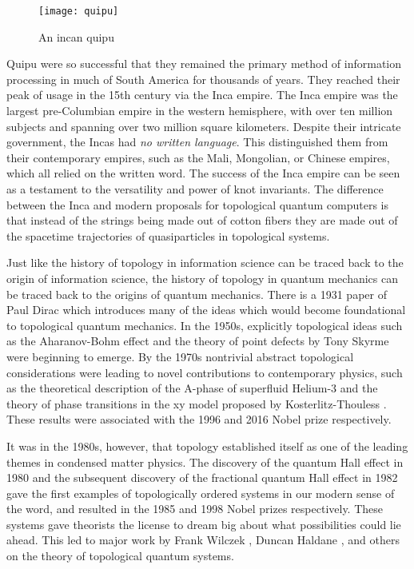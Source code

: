\begin{figure}
\begin{center}
\texttt{[image: quipu]}
\caption{An incan quipu}
\label{fig:quipu}
\end{center}
\end{figure}


Quipu were so successful that they remained the primary method of information processing in much of South America for thousands of years. They reached their peak of usage in the 15th century via the Inca empire. The Inca empire was the largest pre-Columbian empire in the western hemisphere, with over ten million subjects and spanning over two million square kilometers. Despite their intricate government, the Incas had \textit{no written language}. This distinguished them from their contemporary empires, such as the Mali, Mongolian, or Chinese empires, which all relied on the written word. The success of the Inca empire can be seen as a testament to the versatility and power of knot invariants. The difference between the Inca and modern proposals for topological quantum computers is that instead of the strings being made out of cotton fibers they are made out of the spacetime trajectories of quasiparticles in topological systems.

Just like the history of topology in information science can be traced back to the origin of information science, the history of topology in quantum mechanics can be traced back to the origins of quantum mechanics. There is a 1931 paper of Paul Dirac \cite{dirac1931quantised} which introduces many of the ideas which would become foundational to topological quantum mechanics. In the 1950s, explicitly topological ideas such as the Aharanov-Bohm effect \cite{aharonov1959significance} and the theory of point defects by Tony Skyrme \cite{skyrme1962unified} were beginning to emerge. By the 1970s nontrivial abstract topological considerations were leading to novel contributions to contemporary physics, such as the theoretical description of the A-phase of superfluid Helium-3 \cite{anderson1977phase} and the theory of phase transitions in the xy model proposed by Kosterlitz-Thouless \cite{kosterlitz1973ordering}. These results were associated with the 1996 and 2016 Nobel prize respectively.

It was in the 1980s, however, that topology established itself as one of the leading themes in condensed matter physics. The discovery of the quantum Hall effect in 1980 \cite{klitzing1980new} and the subsequent discovery of the fractional quantum Hall effect in 1982 \cite{tsui1982two} gave the first examples of topologically ordered systems in our modern sense of the word, and resulted in the 1985 and 1998 Nobel prizes respectively. These systems gave theorists the license to dream big about what possibilities could lie ahead. This led to major work by Frank Wilczek \cite{wilczek1982quantum, arovas1985statistical}, Duncan Haldane \cite{haldane1983nonlinear, haldane1988model}, and others on the theory of topological quantum systems.

